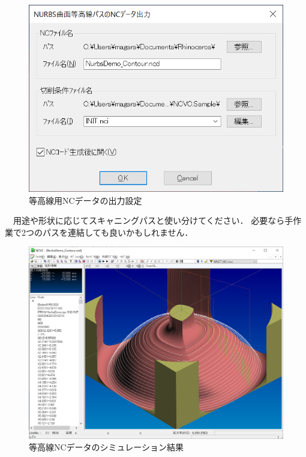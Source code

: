 \begin{figure}[H]
\centering
\includegraphics[scale=0.7]{No3/fig/fig34.png}
\caption{等高線用NCデータの出力設定}
\label{fig:ncvc34}
\end{figure}

　用途や形状に応じてスキャニングパスと使い分けてください．
必要なら手作業で2つのパスを連結しても良いかもしれません．

\begin{figure}[H]
\centering
\includegraphics[scale=0.5]{No3/fig/fig35.png}
\caption{等高線NCデータのシミュレーション結果}
\label{fig:ncvc35}
\end{figure}

